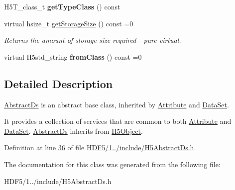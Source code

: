 \begin{DoxyCompactItemize}
\mbox{\label{class_h5_1_1_abstract_ds_a906ad9c7af32bf15219d67b6d8234e33}} 
H5\+T\+\_\+class\+\_\+t {\bfseries get\+Type\+Class} () const
\item 
\mbox{\label{class_h5_1_1_abstract_ds_ae90e2e730c114423a00a2643206abc44}} 
virtual hsize\+\_\+t \hyperlink{class_h5_1_1_abstract_ds_ae90e2e730c114423a00a2643206abc44}{get\+Storage\+Size} () const =0
\begin{DoxyCompactList}\small\item\em Returns the amount of storage size required -\/ pure virtual. \end{DoxyCompactList}\item 
\mbox{\label{class_h5_1_1_abstract_ds_a13c2b6930fd81d9e019acc0ce21c7e55}} 
virtual H5std\+\_\+string {\bfseries from\+Class} () const =0
\end{DoxyCompactItemize}


\subsection{Detailed Description}
\hyperlink{class_h5_1_1_abstract_ds}{Abstract\+Ds} is an abstract base class, inherited by \hyperlink{class_h5_1_1_attribute}{Attribute} and \hyperlink{class_h5_1_1_data_set}{Data\+Set}. 

It provides a collection of services that are common to both \hyperlink{class_h5_1_1_attribute}{Attribute} and \hyperlink{class_h5_1_1_data_set}{Data\+Set}. \hyperlink{class_h5_1_1_abstract_ds}{Abstract\+Ds} inherits from \hyperlink{class_h5_1_1_h5_object}{H5\+Object}. 

Definition at line \hyperlink{_h_d_f5_21_810_81_2include_2_h5_abstract_ds_8h_source_l00036}{36} of file \hyperlink{_h_d_f5_21_810_81_2include_2_h5_abstract_ds_8h_source}{H\+D\+F5/1../include/\+H5\+Abstract\+Ds.\+h}.



The documentation for this class was generated from the following file\+:\begin{DoxyCompactItemize}
\item 
H\+D\+F5/1../include/\+H5\+Abstract\+Ds.\+h\end{DoxyCompactItemize}
